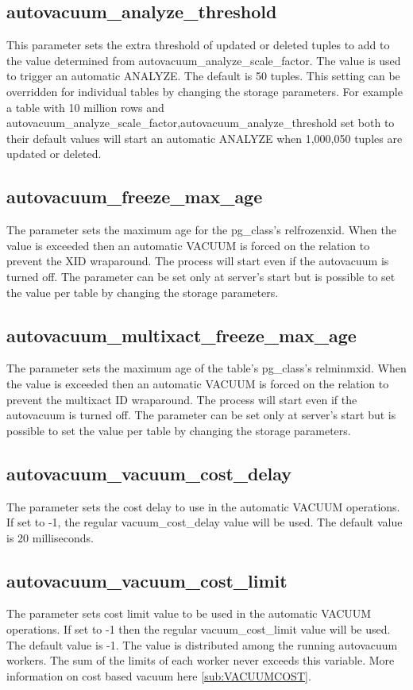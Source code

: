 \subsection{autovacuum\_analyze\_threshold}
This parameter sets the extra threshold of updated or deleted tuples to add to the value determined from 
autovacuum\_analyze\_scale\_factor. The value is used to  trigger an automatic ANALYZE. The default is 50 
tuples. This setting can be overridden for individual tables by changing the storage parameters. For 
example a 
table with 10 million rows and autovacuum\_analyze\_scale\_factor,autovacuum\_analyze\_threshold set both 
to their default values will start an automatic ANALYZE when 1,000,050 tuples are updated or deleted.

\subsection{autovacuum\_freeze\_max\_age}
The parameter sets the maximum age for the pg\_class's relfrozenxid. When the value is exceeded then an 
automatic VACUUM is forced on the relation to prevent the XID wraparound. The process will start 
even if the autovacuum is turned off. The parameter can be set only at server's start but is possible to 
set the value per table by changing the storage parameters.

\subsection{autovacuum\_multixact\_freeze\_max\_age}
The parameter sets the maximum age of the table's pg\_class's relminmxid. When the value is exceeded then 
an automatic VACUUM is forced on the relation to prevent the  multixact ID wraparound. The process will 
start even if the autovacuum is turned off. The parameter can be set only at server's start but is possible 
to set the value per table by changing the storage parameters.

\subsection{autovacuum\_vacuum\_cost\_delay}
The parameter sets the cost delay to use in the automatic VACUUM operations. If set to -1, the regular 
vacuum\_cost\_delay value will be used. The default value is 20 milliseconds. 

\subsection{autovacuum\_vacuum\_cost\_limit}
The parameter sets  cost limit value to be used in the automatic VACUUM operations. If set to -1 then the 
regular vacuum\_cost\_limit value will be used. The default value is -1. The value is distributed among the 
running autovacuum workers. The sum of the limits of each worker never exceeds this variable. More 
information on cost based vacuum here \ref{sub:VACUUMCOST}.



